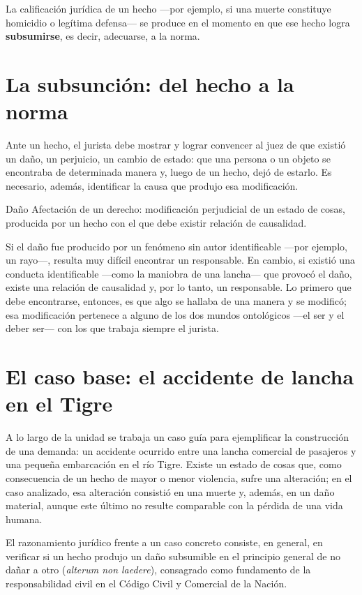 \documentclass[12pt,oneside]{book}
\begin{document}
La calificación jurídica de un hecho —por ejemplo, si una muerte constituye homicidio o legítima defensa— se produce en el momento en que ese hecho logra \textbf{subsumirse}, es decir, adecuarse, a la norma.

\section{La subsunción: del hecho a la norma}

Ante un hecho, el jurista debe mostrar y lograr convencer al juez de que existió un daño, un perjuicio, un cambio de estado: que una persona o un objeto se encontraba de determinada manera y, luego de un hecho, dejó de estarlo. Es necesario, además, identificar la causa que produjo esa modificación.

\begin{definition}{Daño}
Afectación de un derecho: modificación perjudicial de un estado de cosas, producida por un hecho con el que debe existir relación de causalidad.
\end{definition}

Si el daño fue producido por un fenómeno sin autor identificable —por ejemplo, un rayo—, resulta muy difícil encontrar un responsable. En cambio, si existió una conducta identificable —como la maniobra de una lancha— que provocó el daño, existe una relación de causalidad y, por lo tanto, un responsable. Lo primero que debe encontrarse, entonces, es que algo se hallaba de una manera y se modificó; esa modificación pertenece a alguno de los dos mundos ontológicos —el ser y el deber ser— con los que trabaja siempre el jurista.

\section{El caso base: el accidente de lancha en el Tigre}

A lo largo de la unidad se trabaja un caso guía para ejemplificar la construcción de una demanda: un accidente ocurrido entre una lancha comercial de pasajeros y una pequeña embarcación en el río Tigre. Existe un estado de cosas que, como consecuencia de un hecho de mayor o menor violencia, sufre una alteración; en el caso analizado, esa alteración consistió en una muerte y, además, en un daño material, aunque este último no resulte comparable con la pérdida de una vida humana.

\begin{important}
El razonamiento jurídico frente a un caso concreto consiste, en general, en verificar si un hecho produjo un daño subsumible en el principio general de no dañar a otro (\textit{alterum non laedere}), consagrado como fundamento de la responsabilidad civil en el Código Civil y Comercial de la Nación.
\end{important}
\end{document}
